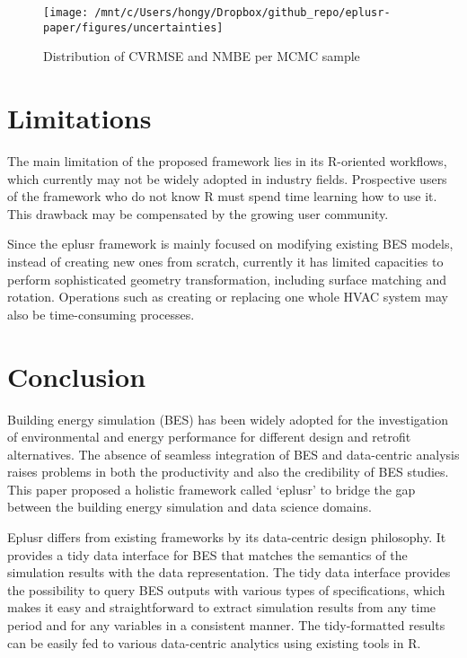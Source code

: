 \documentclass[3p, times]{elsarticle} %
\begin{document}
\begin{figure}[!htb]
\texttt{[image: /mnt/c/Users/hongy/Dropbox/github\_repo/eplusr-paper/figures/uncertainties]} \caption{Distribution of CVRMSE and NMBE per MCMC sample}\label{fig:uncertainties}
\end{figure}

\hypertarget{limitations}{%
\section{Limitations}\label{limitations}}

The main limitation of the proposed framework lies in its R-oriented workflows,
which currently may not be widely adopted in industry fields. Prospective users
of the framework who do not know R must spend time learning how to use it. This
drawback may be compensated by the growing user community.

Since the eplusr framework is mainly focused on modifying existing BES models,
instead of creating new ones from scratch, currently it has limited capacities
to perform sophisticated geometry transformation, including surface matching and
rotation. Operations such as creating or replacing one whole HVAC system may
also be time-consuming processes.

\hypertarget{conclusion}{%
\section{Conclusion}\label{conclusion}}

Building energy simulation (BES) has been widely adopted for the investigation
of environmental and energy performance for different design and retrofit
alternatives. The absence of seamless integration of BES and data-centric
analysis raises problems in both the productivity and also the credibility of
BES studies. This paper proposed a holistic framework called `eplusr' to bridge
the gap between the building energy simulation and data science domains.

Eplusr differs from existing frameworks by its data-centric design philosophy.
It provides a tidy data interface for BES that matches the semantics of the
simulation results with the data representation. The tidy data interface
provides the possibility to query BES outputs with various types of
specifications, which makes it easy and straightforward to extract simulation
results from any time period and for any variables in a consistent manner. The
tidy-formatted results can be easily fed to various data-centric analytics using
existing tools in R.
\end{document}
